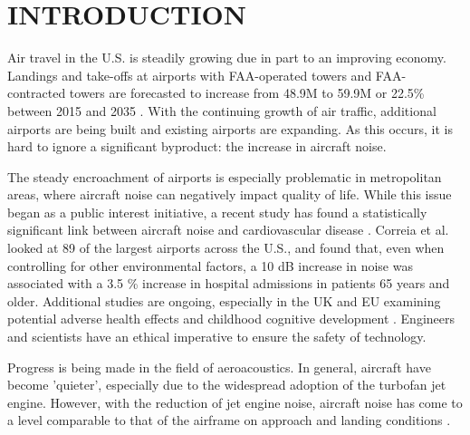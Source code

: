 %
%
%
%
%
%
%
%
%
%


%
%

\chapter{INTRODUCTION}
Air travel in the U.S. is steadily growing due in part to an improving economy. Landings and take-offs at airports with FAA-operated towers and FAA-contracted towers are forecasted to increase from 48.9M to 59.9M or 22.5\% between 2015 and 2035 \cite{faa2015}. With the continuing growth of air traffic, additional airports are being built and existing airports are expanding. As this occurs, it is hard to ignore a significant byproduct: the increase in aircraft noise.

The steady encroachment of airports is especially problematic in metropolitan areas, where aircraft noise can negatively impact quality of life. While this issue began as a public interest initiative, a recent study has found a statistically significant link between aircraft noise and cardiovascular disease \cite{correia2013}. Correia et al. looked at 89 of the largest airports across the U.S., and found that, even when controlling for other environmental factors, a 10 dB increase in noise was associated with a 3.5 \% increase in hospital admissions in patients 65 years and older. Additional studies are ongoing, especially in the UK and EU examining potential adverse health effects and childhood cognitive development \cite{cap2014}. Engineers and scientists have an ethical imperative to ensure the safety of technology. 

Progress is being made in the field of aeroacoustics. In general, aircraft have become 'quieter', especially due to the widespread adoption of the turbofan jet engine. However, with the reduction of jet engine noise, aircraft noise has come to a level comparable to that of the airframe on approach and landing conditions \cite{dob2010}. 

